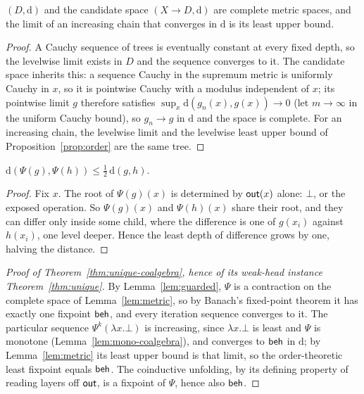 \begin{lemma}[Completeness]\label{lem:metric}
  $(D, \mathrm{d})$ and the candidate space $(X \to D, \mathrm{d})$ are complete metric spaces, and the limit of an increasing chain that converges in $\mathrm{d}$ is its least upper bound.
\end{lemma}
\begin{proof}
  A Cauchy sequence of trees is eventually constant at every fixed depth, so the levelwise limit exists in $D$ and the sequence converges to it. The candidate space inherits this: a sequence Cauchy in the supremum metric is uniformly Cauchy in $x$, so it is pointwise Cauchy with a modulus independent of $x$; its pointwise limit $g$ therefore satisfies $\sup_x \mathrm{d}(g_n(x), g(x)) \to 0$ (let $m \to \infty$ in the uniform Cauchy bound), so $g_n \to g$ in $\mathrm{d}$ and the space is complete. For an increasing chain, the levelwise limit and the levelwise least upper bound of Proposition~\ref{prop:order} are the same tree.
\end{proof}

\begin{lemma}[Guardedness]\label{lem:guarded}
  $\mathrm{d}(\Psi(g), \Psi(h)) \le \tfrac{1}{2}\,\mathrm{d}(g, h)$.
\end{lemma}
\begin{proof}
  Fix $x$. The root of $\Psi(g)(x)$ is determined by $\mathsf{out}(x)$ alone: $\bot$, or the exposed operation. So $\Psi(g)(x)$ and $\Psi(h)(x)$ share their root, and they can differ only inside some child, where the difference is one of $g(x_i)$ against $h(x_i)$, one level deeper. Hence the least depth of difference grows by one, halving the distance.
\end{proof}

\begin{proof}[Proof of Theorem~\ref{thm:unique-coalgebra}, hence of its weak-head instance Theorem~\ref{thm:unique}]
  By Lemma~\ref{lem:guarded}, $\Psi$ is a contraction on the complete space of Lemma~\ref{lem:metric}, so by Banach's fixed-point theorem \cite{banach1922-operations} it has exactly one fixpoint $\mathsf{beh}$, and every iteration sequence converges to it. The particular sequence $\Psi^k(\lambda x.\bot)$ is increasing, since $\lambda x.\bot$ is least and $\Psi$ is monotone (Lemma~\ref{lem:mono-coalgebra}), and converges to $\mathsf{beh}$ in $\mathrm{d}$; by Lemma~\ref{lem:metric} its least upper bound is that limit, so the order-theoretic least fixpoint equals $\mathsf{beh}$. The coinductive unfolding, by its defining property of reading layers off $\mathsf{out}$, is a fixpoint of $\Psi$, hence also $\mathsf{beh}$.
\end{proof}

